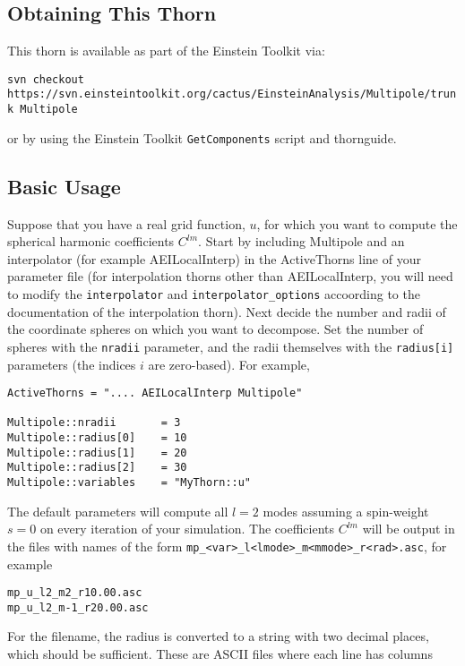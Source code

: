 \documentclass{article}
\begin{document}
\subsection{Obtaining This Thorn}

This thorn is available as part of the Einstein Toolkit via:

{\tt svn checkout https://svn.einsteintoolkit.org/cactus/EinsteinAnalysis/Multipole/trunk Multipole}

or by using the Einstein Toolkit \verb|GetComponents| script and thornguide.

\subsection{Basic Usage}

Suppose that you have a real grid function, $u$, for which you want to
compute the spherical harmonic coefficients $C^{lm}$.  Start by
including Multipole and an interpolator (for example AEILocalInterp)
in the ActiveThorns line of your parameter file (for interpolation
thorns other than AEILocalInterp, you will need to modify the
\verb|interpolator| and \verb|interpolator_options| accoording to the
documentation of the interpolation thorn).  Next decide the number and
radii of the coordinate spheres on which you want to decompose.  Set
the number of spheres with the \verb|nradii| parameter, and the radii
themselves with the \verb|radius[i]| parameters (the indices $i$ are
zero-based).  For example,

\begin{verbatim}
ActiveThorns = ".... AEILocalInterp Multipole"

Multipole::nradii       = 3
Multipole::radius[0]    = 10
Multipole::radius[1]    = 20
Multipole::radius[2]    = 30
Multipole::variables    = "MyThorn::u"
\end{verbatim}

The default parameters will compute all $l = 2$ modes assuming a
spin-weight $s = 0$ on every iteration of your simulation.  The
coefficients $C^{lm}$ will be output in the files with names of the
form \verb|mp_<var>_l<lmode>_m<mmode>_r<rad>.asc|, for example

\begin{verbatim}
mp_u_l2_m2_r10.00.asc
mp_u_l2_m-1_r20.00.asc
\end{verbatim}

For the filename, the radius is converted to a string with two decimal
places, which should be sufficient.  These are ASCII files where each
line has columns
\end{document}
